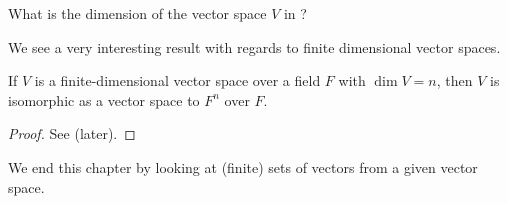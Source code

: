 \begin{exercise}
    What is the dimension of the vector space $V$ in ?
\end{exercise}

We see a very interesting result with regards to finite dimensional vector spaces.

\begin{theorem}\label{thrm-vector-space-of-dimension-n-isomorphic-to-F^n}
    If $V$ is a finite-dimensional vector space over a field $F$ with $\dim{V} = n$, then $V$ is isomorphic as a vector space to $F^n$ over $F$.
\end{theorem}
\begin{proof}
    See  (later).
\end{proof}

We end this chapter by looking at (finite) sets of vectors from a given vector space.

